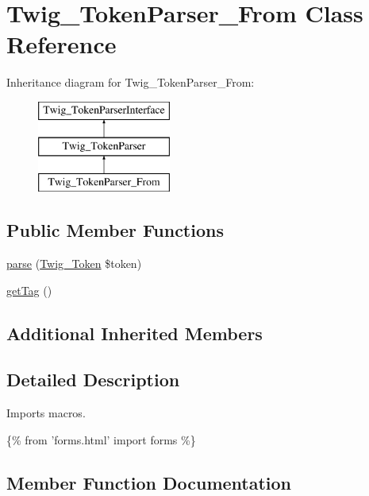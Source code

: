 \hypertarget{class_twig___token_parser___from}{}\section{Twig\+\_\+\+Token\+Parser\+\_\+\+From Class Reference}
\label{class_twig___token_parser___from}
Inheritance diagram for Twig\+\_\+\+Token\+Parser\+\_\+\+From\+:\begin{figure}[H]
\begin{center}
\leavevmode
\includegraphics[height=3.000000cm]{class_twig___token_parser___from}
\end{center}
\end{figure}
\subsection*{Public Member Functions}
\begin{DoxyCompactItemize}
\item 
\hyperlink{class_twig___token_parser___from_a5dfa2e269321584fb74e8b43dabe0efd}{parse} (\hyperlink{class_twig___token}{Twig\+\_\+\+Token} \$token)
\item 
\hyperlink{class_twig___token_parser___from_ab86ba36154b20e6bbfa3ba705f12f9d6}{get\+Tag} ()
\end{DoxyCompactItemize}
\subsection*{Additional Inherited Members}


\subsection{Detailed Description}
Imports macros.


\begin{DoxyPre}
  \{\% from 'forms.html' import forms \%\}
\end{DoxyPre}
 

\subsection{Member Function Documentation}
\hypertarget{class_twig___token_parser___from_ab86ba36154b20e6bbfa3ba705f12f9d6}{}
